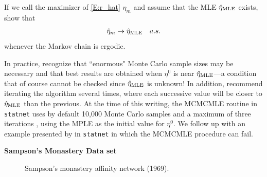 If we call the maximizer of \eqref{E:r_hat} $\hat{\eta}_m$ and assume that the MLE $\hat{\eta}_{\textrm{MLE}}$ exists, \citeauthor{Geyer:1992} show that 
\begin{align*}
\hat{\eta}_m \to \hat{\eta}_{\textrm{MLE}} \quad a.s.
\end{align*}
 whenever the Markov chain is ergodic. 

In practice, \citeauthor{Geyer:1992} recognize that ``enormous" Monte Carlo sample sizes may be necessary and that best results are obtained when $\eta^0$ is near $\hat{\eta}_{\textrm{MLE}}$---a condition that of course cannot be checked since $\hat{\eta}_{\textrm{MLE}}$ is unknown!  In addition, \citeauthor{Geyer:1992} recommend iterating the algorithm several times, where each successive value will be closer to $\hat{\eta}_{\textrm{MLE}}$ than the previous.  At the time of this writing, the MCMCMLE routine in \texttt{statnet} uses by default 10,000 Monte Carlo samples and a maximum of three iterations \citep{statnet:R}, using the MPLE as the initial value for $\eta^0$.  We follow up with an example presented by \citet{ergm} in \texttt{statnet} in which the MCMCMLE procedure can fail.

\vspace*{0.2in}

\textbf{Sampson's Monastery Data set}

\begin{figure} 
\begin{center} 
\end{center} 
\caption{Sampson's monastery affinity network (1969).} 
\label{fig-samplike} 
\end{figure} 

